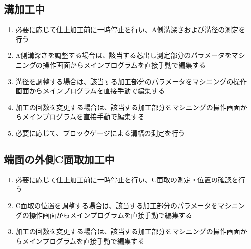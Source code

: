 \subsection{溝加工中}
\begin{enumerate}
\item 必要に応じて仕上加工前に一時停止を行い、A側溝深さおよび溝径の測定を行う
\item A側溝深さを調整する場合は、該当する芯出し測定部分のパラメータをマシニングの操作画面からメインプログラムを直接手動で編集する
\item 溝径を調整する場合は、該当する加工部分のパラメータをマシニングの操作画面からメインプログラムを直接手動で編集する
\item {}加工の回数を変更する場合は、該当する加工部分をマシニングの操作画面からメインプログラムを直接手動で編集する
\item 必要に応じて、ブロックゲージによる溝幅の測定を行う
\end{enumerate}


\subsection{端面の外側C面取加工中}
\begin{enumerate}
\item 必要に応じて仕上加工前に一時停止を行い、C面取の測定・位置の確認を行う
\item C面取の位置を調整する場合は、該当する加工部分のパラメータをマシニングの操作画面からメインプログラムを直接手動で編集する
\item {}加工の回数を変更する場合は、該当する加工部分をマシニングの操作画面からメインプログラムを直接手動で編集する
\end{enumerate}


